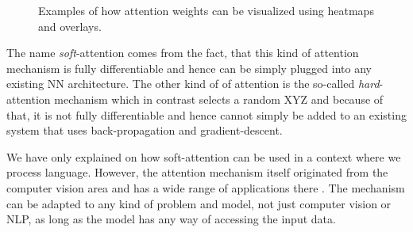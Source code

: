 \begin{figure}[h]
	\caption{Examples of how attention weights can be visualized using heatmaps and overlays.}
	\label{fundamentals:seq2seq:attention_weights_visualization}
\end{figure}

The name \emph{soft}-attention comes from the fact, that this kind of attention mechanism is fully differentiable and hence can be simply plugged into any existing NN architecture. The other kind of of attention is the so-called \emph{hard}-attention mechanism which in contrast selects a random XYZ and because of that, it is not fully differentiable and hence cannot simply be added to an existing system that uses back-propagation and gradient-descent.

We have only explained on how soft-attention can be used in a context where we process language. However, the attention mechanism itself originated from the computer vision area \cite{Desimone:1995}\cite{Itti:1998}\cite{Mnih:2014} and has a wide range of applications there \cite{Gregor:2015}\cite{Xu:2015}\cite{Cho:2015}. The mechanism can be adapted to any kind of problem and model, not just computer vision or NLP, as long as the model has any way of accessing the input data.

